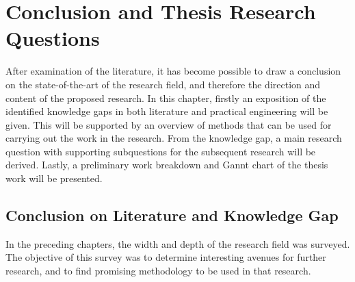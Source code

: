 \chapter{Conclusion and Thesis Research Questions}
\label{ch:conclusion}

After examination of the literature, it has become possible to draw a conclusion on the state-of-the-art of the research field, and therefore the direction and content of the proposed research. In this chapter, firstly an exposition of the identified knowledge gaps in both literature and practical engineering will be given. This will be supported by an overview of methods that can be used for carrying out the work in the research. From the knowledge gap, a main research question with supporting subquestions for the subsequent research will be derived. Lastly, a preliminary work breakdown and Gannt chart of the thesis work will be presented.

\section{Conclusion on Literature and Knowledge Gap}
In the preceding chapters, the width and depth of the research field was surveyed. The objective of this survey was to determine interesting avenues for further research, and to find promising methodology to be used in that research. \\


